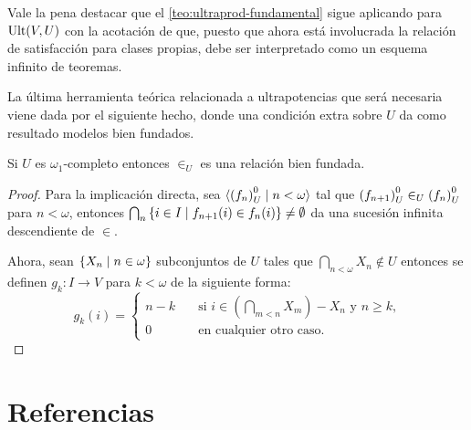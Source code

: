 Vale la pena destacar que el \cref{teo:ultraprod-fundamental} sigue aplicando para
$\operatorname{Ult}(V,U)$ con la acotación de que, puesto que ahora está involucrada la relación
de satisfacción para clases propias, debe ser interpretado como un esquema infinito de teoremas.

La última herramienta teórica relacionada a ultrapotencias que será necesaria viene
dada por el siguiente hecho, donde una condición extra sobre $U$ da como resultado
modelos bien fundados.

\begin{teo}
    Si $U$ es $\omega_1$-completo entonces $\in_U$ es una relación bien fundada.
\end{teo}
\begin{proof}
    Para la implicación directa, sea $\langle {(f_n)}_U^0\mid n<\omega \rangle$ tal que
    ${(f_{n+1})}_U^0\in_U{(f_n)}_U^0$ para $n<\omega$,
    entonces $\bigcap_n\left\{ i\in I\mid f_{n+1}(i)\in f_n(i) \right\}\neq\emptyset$
    da una sucesión infinita descendiente de $\in$.

    Ahora, sean $\left\{ X_n\mid n\in\omega \right\}$ subconjuntos de $U$ tales que
    $\bigcap_{n<\omega} X_n\notin U$ entonces se definen $g_k\colon I\to V$
    para $k<\omega$ de la siguiente forma:
    \[
        g_k(i) =
        \begin{cases}
          n-k\quad & \text{si $i\in(\bigcap_{m<n} X_m) - X_n$ y $n\geq k$,}\\
          0\quad & \text{en cualquier otro caso.}
        \end{cases}
    \]
\end{proof}

\fi
\backmatter
\ifreferencias
\chapter*{Referencias}
\printbibliography[heading=mybib]
\fi

